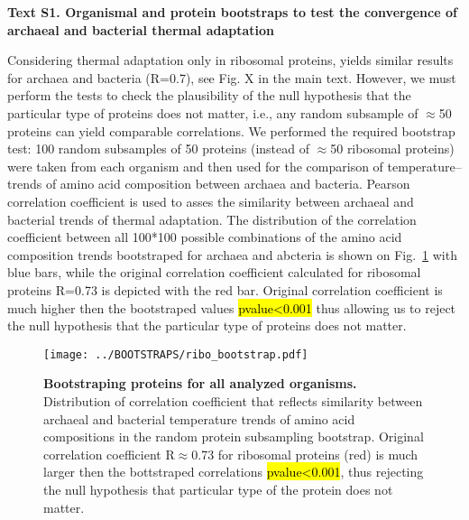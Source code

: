 \documentclass{report}
\begin{document}
{\bf Text S1. Organismal and protein bootstraps to test the convergence of archaeal and bacterial thermal adaptation }


Considering thermal adaptation only in ribosomal proteins, yields similar results for archaea and bacteria (R=0.7), see Fig. X in the main text. However, we must perform the tests to check the plausibility of the null hypothesis that the particular type of proteins does not matter, i.e., any random subsample of $\approx$50 proteins can yield comparable correlations. We performed the required bootstrap test: 100 random subsamples of 50 proteins (instead of $\approx$50 ribosomal proteins) were taken from each organism and then used for the comparison of temperature--trends of amino acid composition between archaea and bacteria. Pearson correlation coefficient is used to asses the similarity between archaeal and bacterial trends of thermal adaptation. The distribution of the correlation coefficient between all 100*100 possible combinations of the amino acid composition trends bootstraped for archaea and abcteria is shown on Fig.~\ref{fig1} with blue bars, while the original correlation coefficient calculated for ribosomal proteins R=0.73 is depicted with the red bar. Original correlation coefficient is much higher then the bootstraped values \hl{pvalue\textless0.001} thus allowing us to reject the null hypothesis that the particular type of proteins does not matter. 
\begin{figure}[h!]
	\centering
	\texttt{[image: ../BOOTSTRAPS/ribo\_bootstrap.pdf]}
	\caption{
	{\bf Bootstraping proteins for all analyzed organisms.} Distribution of correlation coefficient that reflects similarity between archaeal and bacterial temperature trends of amino acid compositions in the random protein subsampling bootstrap. Original correlation coefficient R$\approx$0.73 for ribosomal proteins (red) is much larger then the bottstraped correlations \hl{pvalue\textless0.001}, thus rejecting the null hypothesis that particular type of the protein does not matter. 
	}
	\label{fig1}
\end{figure}
\end{document}
